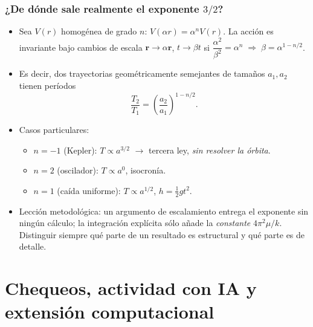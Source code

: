 \documentclass[10pt]{beamer}
\newcommand{\vect}[1]{\mathbf{#1}}
\begin{document}
\begin{frame}
\frametitle{¿De dónde sale realmente el exponente $3/2$?}
\begin{itemize}
  \item<1-> Sea $V(r)$ homogénea de grado $n$: $V(\alpha r)=\alpha^{n}V(r)$.
        La acción es invariante bajo cambios de escala
        $\vect{r}\to\alpha\vect{r}$, $t\to\beta t$ si
        $\dfrac{\alpha^{2}}{\beta^{2}}=\alpha^{n}
        \;\Rightarrow\; \beta=\alpha^{1-n/2}$.
  \item<2-> Es decir, dos trayectorias geométricamente semejantes de tamaños
        $a_1,a_2$ tienen períodos
        \[ \frac{T_2}{T_1}=\left(\frac{a_2}{a_1}\right)^{1-n/2}. \]
  \item<3-> Casos particulares:
        \begin{itemize}
          \item $n=-1$ (Kepler): $T\propto a^{3/2}$ \quad$\rightarrow$\quad
                tercera ley, \emph{sin resolver la órbita}.
          \item $n=2$ (oscilador): $T\propto a^{0}$, isocronía.
          \item $n=1$ (caída uniforme): $T\propto a^{1/2}$, $h=\tfrac12 gt^2$.
        \end{itemize}
  \item<4-> \alert{Lección metodológica:} un argumento de escalamiento entrega el
        exponente sin ningún cálculo; la integración explícita sólo añade la
        \emph{constante} $4\pi^{2}\mu/k$. Distinguir siempre qué parte de un
        resultado es estructural y qué parte es de detalle.
\end{itemize}
\end{frame}

\section{Chequeos, actividad con IA y extensión computacional}
\end{document}
